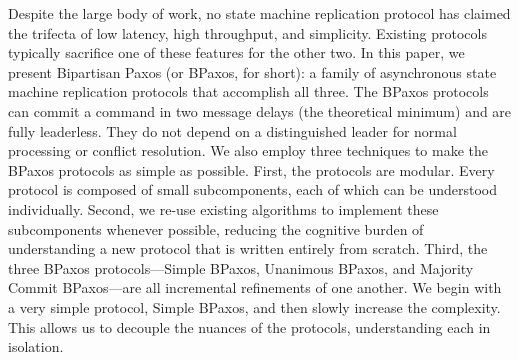 Despite the large body of work, no state machine replication protocol has
claimed the trifecta of low latency, high throughput, and simplicity. Existing
protocols typically sacrifice one of these features for the other two. In this
paper, we present Bipartisan Paxos (or BPaxos, for short): a family of
asynchronous state machine replication protocols that accomplish all three. The
BPaxos protocols can commit a command in two message delays (the theoretical
minimum) and are fully leaderless. They do not depend on a distinguished leader
for normal processing or conflict resolution. We also employ three techniques
to make the BPaxos protocols as simple as possible.
%
First, the protocols are modular. Every protocol is composed of small
subcomponents, each of which can be understood individually.
%
Second, we re-use existing algorithms to implement these subcomponents whenever
possible, reducing the cognitive burden of understanding a new protocol that is
written entirely from scratch.
%
Third, the three BPaxos protocols---Simple BPaxos, Unanimous BPaxos, and
Majority Commit BPaxos---are all incremental refinements of one another. We
begin with a very simple protocol, Simple BPaxos, and then slowly increase the
complexity. This allows us to decouple the nuances of the protocols,
understanding each in isolation.
